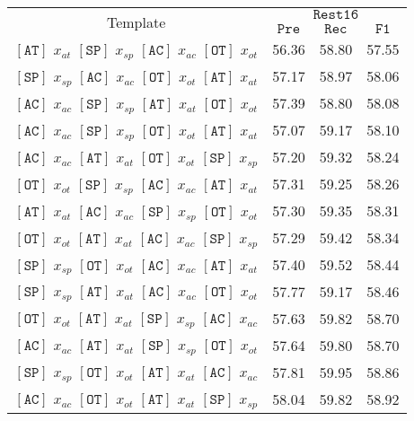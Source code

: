 \documentclass[11pt]{article}
\begin{document}
\begin{table*}[]
\small
    \centering
    \begin{tabular}{c|ccc}
    \toprule
    \multirow{2}{*}{Template} & \multicolumn{3}{c}{$\mathtt{Rest16}$} \\ 
    & $\mathtt{Pre}$ & $\mathtt{Rec}$ & $\mathtt{F1}$ \\
    \midrule
$\mathtt{[AT]}$ $x_{at}$ $\mathtt{[SP]}$ $x_{sp}$ $\mathtt{[AC]}$ $x_{ac}$ $\mathtt{[OT]}$ $x_{ot}$ & 56.36 & 58.80 & 57.55 \\
$\mathtt{[SP]}$ $x_{sp}$ $\mathtt{[AC]}$ $x_{ac}$ $\mathtt{[OT]}$ $x_{ot}$ $\mathtt{[AT]}$ $x_{at}$ & 57.17 & 58.97 & 58.06 \\
$\mathtt{[AC]}$ $x_{ac}$ $\mathtt{[SP]}$ $x_{sp}$ $\mathtt{[AT]}$ $x_{at}$ $\mathtt{[OT]}$ $x_{ot}$ & 57.39 & 58.80 & 58.08 \\
$\mathtt{[AC]}$ $x_{ac}$ $\mathtt{[SP]}$ $x_{sp}$ $\mathtt{[OT]}$ $x_{ot}$ $\mathtt{[AT]}$ $x_{at}$ & 57.07 & 59.17 & 58.10 \\
$\mathtt{[AC]}$ $x_{ac}$ $\mathtt{[AT]}$ $x_{at}$ $\mathtt{[OT]}$ $x_{ot}$ $\mathtt{[SP]}$ $x_{sp}$ & 57.20 & 59.32 & 58.24 \\
$\mathtt{[OT]}$ $x_{ot}$ $\mathtt{[SP]}$ $x_{sp}$ $\mathtt{[AC]}$ $x_{ac}$ $\mathtt{[AT]}$ $x_{at}$ & 57.31 & 59.25 & 58.26 \\
$\mathtt{[AT]}$ $x_{at}$ $\mathtt{[AC]}$ $x_{ac}$ $\mathtt{[SP]}$ $x_{sp}$ $\mathtt{[OT]}$ $x_{ot}$ & 57.30 & 59.35 & 58.31 \\
$\mathtt{[OT]}$ $x_{ot}$ $\mathtt{[AT]}$ $x_{at}$ $\mathtt{[AC]}$ $x_{ac}$ $\mathtt{[SP]}$ $x_{sp}$ & 57.29 & 59.42 & 58.34 \\
$\mathtt{[SP]}$ $x_{sp}$ $\mathtt{[OT]}$ $x_{ot}$ $\mathtt{[AC]}$ $x_{ac}$ $\mathtt{[AT]}$ $x_{at}$ & 57.40 & 59.52 & 58.44 \\
$\mathtt{[SP]}$ $x_{sp}$ $\mathtt{[AT]}$ $x_{at}$ $\mathtt{[AC]}$ $x_{ac}$ $\mathtt{[OT]}$ $x_{ot}$ & 57.77 & 59.17 & 58.46 \\
$\mathtt{[OT]}$ $x_{ot}$ $\mathtt{[AT]}$ $x_{at}$ $\mathtt{[SP]}$ $x_{sp}$ $\mathtt{[AC]}$ $x_{ac}$ & 57.63 & 59.82 & 58.70 \\
$\mathtt{[AC]}$ $x_{ac}$ $\mathtt{[AT]}$ $x_{at}$ $\mathtt{[SP]}$ $x_{sp}$ $\mathtt{[OT]}$ $x_{ot}$ & 57.64 & 59.80 & 58.70 \\
$\mathtt{[SP]}$ $x_{sp}$ $\mathtt{[OT]}$ $x_{ot}$ $\mathtt{[AT]}$ $x_{at}$ $\mathtt{[AC]}$ $x_{ac}$ & 57.81 & 59.95 & 58.86 \\
$\mathtt{[AC]}$ $x_{ac}$ $\mathtt{[OT]}$ $x_{ot}$ $\mathtt{[AT]}$ $x_{at}$ $\mathtt{[SP]}$ $x_{sp}$ & 58.04 & 59.82 & 58.92 \\

\end{tabular}
\end{table*}
\end{document}

